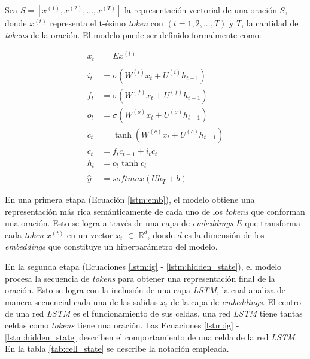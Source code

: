 Sea $S = [x^{(1)}, x^{(2)}, ..., x^{(T)}]$ la representación vectorial de una oración $S$, donde $x^{(t)}$ representa el t-ésimo \textit{token} con $(t = 1, 2, ..., T)$ y $T$, la cantidad de \textit{tokens} de la oración. El modelo puede ser definido formalmente como:

\begin{align}
  x_{t} &= Ex^{(t)} \label{lstm:emb} \\
  \nonumber \\
  i_{t} &= \sigma{(W^{(i)} x_{t} + U^{(i)}h_{t-1})} \label{lstm:ig} \\
  f_{t} &= \sigma{(W^{(f)} x_{t} + U^{(f)}h_{t-1})} \label{lstm:fg} \\
  o_{t} &= \sigma{(W^{(o)} x_{t} + U^{(o)}h_{t-1})} \label{lstm:og} \\
  \tilde{c_{t}} &= \tanh(W^{(c)} x_{t} + U^{(c)}h_{t-1}) \label{lstm:new_memory_generation} \\
  c_{t} &= f_{t}c_{t-1} + i_{t}\tilde{c_{t}} \label{lstm:cell_state} \\
  h_{t} &= o_{t}\tanh{c_{t}} \label{lstm:hidden_state} \\
  \nonumber \\
  \hat{y} &= softmax(Uh_{T} + b) \label{lstm:pred}
\end{align}

En una primera etapa (Ecuación \ref{lstm:emb}), el modelo obtiene una representación más rica semánticamente de cada uno de los \textit{tokens} que conforman una oración. Esto se logra a través de una capa de \textit{embeddings} $E$ que transforma cada \textit{token} $x^{(t)}$ en un vector $x_{t}$ $\in$ ${\mathbb{R}} ^{d}$, donde $d$ es la dimensión de los \textit{embeddings} que constituye un hiperparámetro del modelo.

En la segunda etapa (Ecuaciones \ref{lstm:ig} - \ref{lstm:hidden_state}), el modelo procesa la secuencia de \textit{tokens} para obtener una representación final de la oración. Esto se logra con la inclusión de una capa \textit{LSTM}, la cual analiza de manera secuencial cada una de las salidas $x_{t}$ de la capa de \textit{embeddings}. El centro de una red \textit{LSTM} es el funcionamiento de sus celdas, una red \textit{LSTM} tiene tantas celdas como \textit{tokens} tiene una oración. Las Ecuaciones \ref{lstm:ig} - \ref{lstm:hidden_state} describen el comportamiento de una celda de la red \textit{LSTM}. En la tabla \ref{tab:cell_state} se describe la notación empleada.

